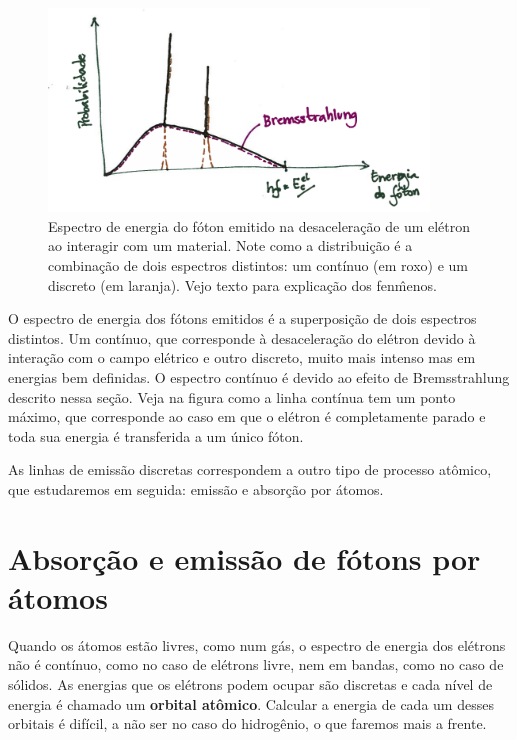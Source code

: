 \documentclass{article}
\begin{document}
\begin{figure}[ht]
\includegraphics[width=0.9\textwidth]{brem.png}
\caption{\label{fig:brem}Espectro de energia do f\'oton emitido na desacelera\c c\~ao de um el\'etron ao interagir com um material. Note como a distribui\c c\~ao \'e a combina\c c\~ao de dois espectros distintos: um cont\'inuo (em roxo) e um discreto (em laranja). Vejo texto para explica\c c\~ao dos fen\^menos.}
\end{figure}
O espectro de energia dos f\'otons emitidos \'e a superposi\c c\~ao de dois espectros distintos. Um cont\'inuo, que corresponde \`a desacelera\c c\~ao do el\'etron devido \`a intera\c c\~ao com o campo el\'etrico e outro discreto, muito mais intenso mas em energias bem definidas. O espectro cont\'inuo \'e devido ao efeito de Bremsstrahlung descrito nessa se\c c\~ao. Veja na figura como a linha cont\'inua tem um ponto m\'aximo, que corresponde ao caso em que o el\'etron \'e completamente parado e toda sua energia \'e transferida a um \'unico f\'oton.

As linhas de emiss\~ao discretas correspondem a outro tipo de processo at\^omico, que estudaremos em seguida: emiss\~ao e absor\c c\~ao por \'atomos.

\section{Absor\c c\~ao e emiss\~ao de f\'otons por \'atomos}

Quando os \'atomos est\~ao livres, como num g\'as, o espectro de energia dos el\'etrons n\~ao \'e cont\'inuo, como no caso de el\'etrons livre, nem em bandas, como no caso de s\'olidos. As energias que os el\'etrons podem ocupar s\~ao discretas e cada n\'ivel de energia \'e chamado um \textbf{orbital at\^omico}. Calcular a energia de cada um desses orbitais \'e dif\'icil, a n\~ao ser no caso do hidrog\^enio, o que faremos mais a frente.
\end{document}
